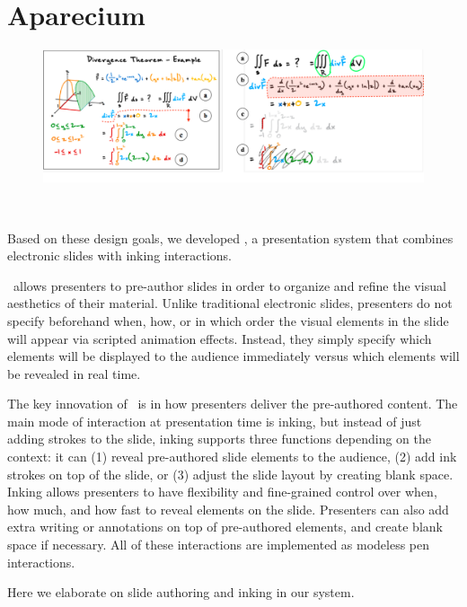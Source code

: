 \section{Aparecium}
\begin{figure}
  \centering
  \includegraphics[width=2.0\columnwidth]{figures/inking_functions}
  \caption{}~\label{fig:inking_functions}
\end{figure}


Based on these design goals, we developed \interface, a presentation system that combines electronic slides with inking interactions. 

\interface\ allows presenters to pre-author slides in order to organize and refine the visual aesthetics of their material.
%
Unlike traditional electronic slides, presenters do not specify beforehand when, how, or in which order the visual elements in the slide will appear via scripted animation effects. Instead, they simply specify which elements will be displayed to the audience immediately versus which elements will be revealed in real time. 

The key innovation of \interface\ is in how presenters deliver the pre-authored content.
The main mode of interaction at presentation time is inking, but instead of just adding strokes to the slide, inking supports three functions depending on the context: it can (1) reveal pre-authored slide elements to the audience, (2) add ink strokes on top of the slide, or (3) adjust the slide layout by creating blank space. Inking allows presenters to have flexibility and fine-grained control over when, how much, and how fast to reveal elements on the slide. Presenters can also add extra writing or annotations on top of pre-authored elements, and create blank space if necessary. All of these interactions are implemented as modeless pen interactions. 

Here we elaborate on slide authoring and inking in our system.

